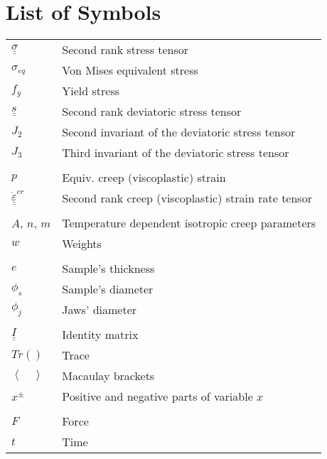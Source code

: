 \newcommand{\uu}[1]{\underline{\underline{#1}}}
  \section*{List of Symbols}
  \begin{tabular}{l{0.5cm}l{7cm}}
    $\uu{\sigma}$ &Second rank stress tensor\\
    $\sigma_{eq}$ &Von Mises equivalent stress \\
    $f_{y}$       &Yield stress \\
    $\uu{s}$      &Second rank deviatoric stress tensor \\
    $J_{2}$       &Second invariant of the deviatoric stress tensor\\
    $J_{3}$       &Third invariant of the deviatoric stress tensor\\

    \multicolumn{2}{c}{} \\

    $p$                          &Equiv. creep (viscoplastic) strain \\
    $\uu{\dot \varepsilon}^{cr}$ &Second rank creep (viscoplastic) strain
    rate tensor\\

    \multicolumn{2}{c}{} \\

    $A$, $n$, $m$          &Temperature dependent isotropic creep parameters \\
    $w$                    &Weights \\

    \multicolumn{2}{c}{} \\

    $e$           &Sample's thickness \\
    $\phi_s$      &Sample's diameter \\
    $\phi_j$      &Jaws' diameter \\

    \multicolumn{2}{c}{} \\

    $\uu{I}$      &Identity matrix \\
    $Tr()$        &Trace \\
    $\left\langle \quad \right\rangle$  &Macaulay brackets \\
    $x^{\pm}$  &Positive and negative parts of variable $x$\\

    \multicolumn{2}{c}{} \\

    $F$  &Force \\
    $t$  &Time \\
  \end{tabular}
